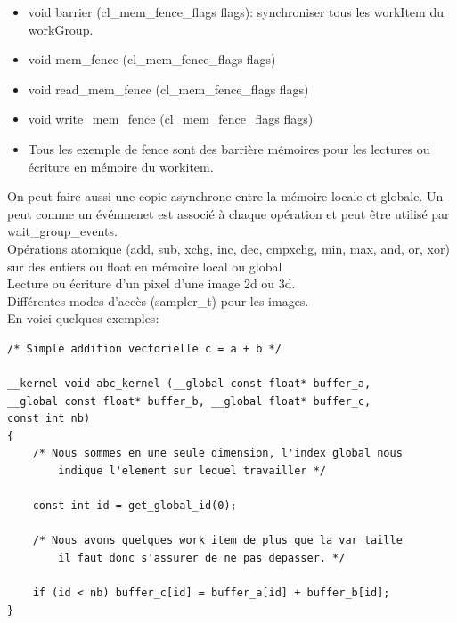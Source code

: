 \documentclass[oneside]{book}
\begin{document}
\begin{itemize}
\item void barrier (cl\_mem\_fence\_flags flags): synchroniser tous les workItem du workGroup.
\item void mem\_fence (cl\_mem\_fence\_flags flags)
\item void read\_mem\_fence (cl\_mem\_fence\_flags flags)
\item void write\_mem\_fence (cl\_mem\_fence\_flags flags)
\item Tous les exemple de fence sont des barrière mémoires pour les lectures ou écriture en mémoire du workitem.
\end{itemize}
On peut faire aussi une copie asynchrone entre la mémoire locale et globale. Un peut comme un événmenet est associé à chaque opération et peut être utilisé par wait\_group\_events.\\

Opérations atomique (add, sub, xchg, inc, dec, cmpxchg, min, max, and, or, xor) sur des entiers ou float en mémoire local ou global\\

Lecture ou écriture d'un pixel d'une image 2d ou 3d.\\

Différentes modes d'accès (sampler\_t) pour les images.\\

En voici quelques exemples:\\

\begin{lstlisting}
/* Simple addition vectorielle c = a + b */

__kernel void abc_kernel (__global const float* buffer_a,
__global const float* buffer_b, __global float* buffer_c,
const int nb)
{
	/* Nous sommes en une seule dimension, l'index global nous
		indique l'element sur lequel travailler */
		
	const int id = get_global_id(0);

	/* Nous avons quelques work_item de plus que la var taille
		il faut donc s'assurer de ne pas depasser. */
	
	if (id < nb) buffer_c[id] = buffer_a[id] + buffer_b[id];
}
\end{lstlisting}
\end{document}
